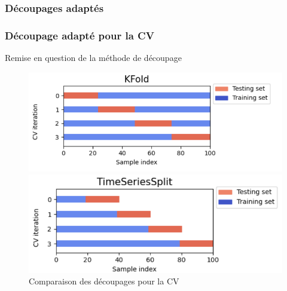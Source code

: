 \documentclass{beamer}
\begin{document}
\subsubsection{Découpages adaptés}
\begin{frame}
	\frametitle{Découpage adapté pour la CV}
		Remise en question de la méthode de découpage
		\begin{figure}[h]
			\centering
			\begin{minipage}{0.5\textwidth}
				\includegraphics[scale=0.3]{kfold}
			\end{minipage}
			\centering
			\begin{minipage}{0.5\textwidth}
				\includegraphics[scale=0.3]{tscv}
			\end{minipage}
		\caption{Comparaison des découpages pour la CV}
		\end{figure}
\end{frame}
\end{document}
